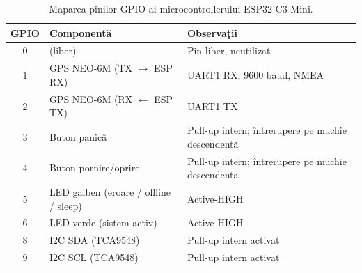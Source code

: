 \documentclass[12pt,a4paper,twoside]{article}
\begin{document}
\begin{table}[H]
\centering
\small
\renewcommand{\arraystretch}{1.3}
\begin{tabular}{|c|>{\raggedright\arraybackslash}p{4.0cm}|>{\raggedright\arraybackslash}p{6.5cm}|}
\hline
\textbf{GPIO} & \textbf{Componentă} & \textbf{Observaţii}\\
\hline
0  & (liber) & Pin liber, neutilizat\\
\hline
1  & GPS NEO-6M (TX $\rightarrow$ ESP RX) & UART1 RX, 9600 baud, NMEA\\
\hline
2  & GPS NEO-6M (RX $\leftarrow$ ESP TX) & UART1 TX\\
\hline
3  & Buton panică & Pull-up intern; întrerupere pe muchie descendentă\\
\hline
4  & Buton pornire/oprire & Pull-up intern; întrerupere pe muchie descendentă\\
\hline
5  & LED galben (eroare / offline / sleep) & Active-HIGH\\
\hline
6  & LED verde (sistem activ) & Active-HIGH\\
\hline
8  & I2C SDA (TCA9548) & Pull-up intern activat\\
\hline
9  & I2C SCL (TCA9548) & Pull-up intern activat\\
\hline
\end{tabular}
\caption{Maparea pinilor GPIO ai microcontrollerului ESP32-C3 Mini.}
\label{tab:gpio-map}
\end{table}
\end{document}
